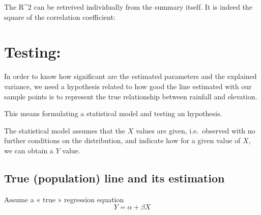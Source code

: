 \documentclass[
  letterpaper,
  DIV=11,
  numbers=noendperiod]{scrreprt}
\newenvironment{Shaded}{\begin{snugshade}}{\end{snugshade}}
\newcommand{\CommentTok}[1]{\textcolor[rgb]{0.37,0.37,0.37}{#1}}
\newcommand{\DecValTok}[1]{\textcolor[rgb]{0.68,0.00,0.00}{#1}}
\newcommand{\FunctionTok}[1]{\textcolor[rgb]{0.28,0.35,0.67}{#1}}
\newcommand{\NormalTok}[1]{\textcolor[rgb]{0.00,0.23,0.31}{#1}}
\newcommand{\SpecialCharTok}[1]{\textcolor[rgb]{0.37,0.37,0.37}{#1}}
\begin{document}
The R\^{}2 can be retreived individually from the summary itself. It is
indeed the square of the correlation coefficient:

\begin{Shaded}
\end{Shaded}

\section{Testing:}\label{testing}

In order to know how significant are the estimated parameters and the
explained variance, we need a hypothesis related to how good the line
estimated with our sample points is to represent the true relationship
between rainfall and elevation.

This means formulating a statistical model and testing an hypothesis.

The statistical model assumes that the \(X\) values are given,
i.e.~observed with no further conditions on the distribution, and
indicate how for a given value of \(X\), we can obtain a \(Y\) value.

\subsection{True (population) line and its
estimation}\label{true-population-line-and-its-estimation}

Assume a « true » regression equation \[Y = \alpha + \beta X\]
\end{document}
